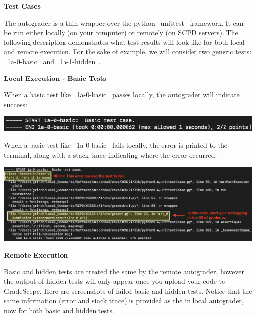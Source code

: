 {\bf Test Cases}

The autograder is a thin wrapper over the python ~unittest~ framework.  It can
be run either locally (on your computer) or remotely (on SCPD servers).  The
following description demonstrates what test results will look like for both
local and remote execution.  For the sake of example, we will consider two
generic tests: ~1a-0-basic~ and ~1a-1-hidden~.




{\bf Local Execution - Basic Tests}

When a basic test like ~1a-0-basic~ passes locally, the autograder will indicate
success:

\begin{center}
\includegraphics[width=1\textwidth]{00-instructions/local-basic-passed.png}
\end{center}

When a basic test like ~1a-0-basic~ fails locally, the error is printed to the
terminal, along with a stack trace indicating where the error occurred:

\begin{center}
\includegraphics[width=1\textwidth]{00-instructions/local-basic-failed.png}
\end{center}

{\bf Remote Execution}

Basic and hidden tests are treated the same by the remote autograder, however the output of hidden tests will only appear once you upload your code to GradeScope.  Here are
screenshots of failed basic and hidden tests.  Notice that the same information
(error and stack trace) is provided as the in local autograder, now for both
basic and hidden tests.

